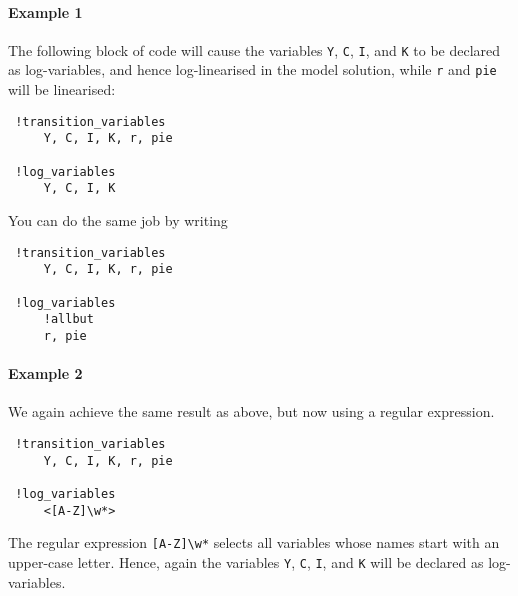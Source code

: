  \paragraph{Example 1}
 
 The following block of code will cause the variables \texttt{Y},
 \texttt{C}, \texttt{I}, and \texttt{K} to be declared as log-variables,
 and hence log-linearised in the model solution, while \texttt{r} and
 \texttt{pie} will be linearised:
 
 \begin{verbatim}
 !transition_variables
     Y, C, I, K, r, pie
 
 !log_variables
     Y, C, I, K
 \end{verbatim}
 
 You can do the same job by writing
 
 \begin{verbatim}
 !transition_variables
     Y, C, I, K, r, pie
 
 !log_variables
     !allbut
     r, pie
 \end{verbatim}
 
 \paragraph{Example 2}
 
 We again achieve the same result as above, but now using a regular
 expression.
 
 \begin{verbatim}
 !transition_variables
     Y, C, I, K, r, pie
 
 !log_variables
     <[A-Z]\w*>
 \end{verbatim}
 
 The regular expression \texttt{{[}A-Z{]}\textbackslash{}w*} selects all
 variables whose names start with an upper-case letter. Hence, again the
 variables \texttt{Y}, \texttt{C}, \texttt{I}, and \texttt{K} will be
 declared as log-variables.


